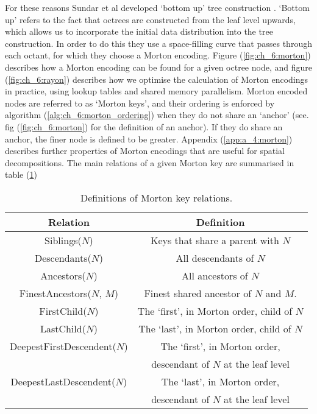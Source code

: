 For these reasons Sundar et al developed `bottom up' tree construction \cite{sundar2008bottom}. `Bottom up' refers to the fact that octrees are constructed from the leaf level upwards, which allows us to incorporate the initial data distribution into the tree construction. In order to do this they use a space-filling curve that passes through each octant, for which they choose a Morton encoding. Figure (\ref{fig:ch_6:morton}) describes how a Morton encoding can be found for a given octree node, and figure (\ref{fig:ch_6:rayon}) describes how we optimise the calculation of Morton encodings in practice, using lookup tables and shared memory parallelism. Morton encoded nodes are referred to as `Morton keys', and their ordering is enforced by algorithm (\ref{alg:ch_6:morton_ordering}) when they do not share an `anchor' (see. fig (\ref{fig:ch_6:morton}) for the definition of an anchor). If they do share an anchor, the finer node is defined to be greater. Appendix (\ref{app:a_4:morton}) describes further properties of Morton encodings that are useful for spatial decompositions. The main relations of a given Morton key are summarised in table (\ref{table:ch_6:morton})

\begin{table}[h!]
    \centering
    \begin{tabular}{||c c||} 
        \hline
        Relation & Definition \\ [0.5ex]
        \hline\hline
        Siblings($N$) & Keys that share a parent with $N$  \\
        Descendants($N$) & All descendants of $N$  \\
        Ancestors($N$) & All ancestors of $N$  \\
        FinestAncestors($N$, $M$) & Finest shared ancestor of $N$ and $M$.  \\
        FirstChild($N$) & The `first', in Morton order, child of $N$  \\
        LastChild($N$) & The `last', in Morton order, child of $N$  \\
        DeepestFirstDescendent($N$) & The `first', in Morton order,  \\ 
         &  descendant of $N$ at the leaf level \\
        DeepestLastDescendent($N$) & The `last', in Morton order, \\
         & descendant of $N$ at the leaf level \\
        
        \hline
    \end{tabular}
    \caption{Definitions of Morton key relations.}
    \label{table:ch_6:morton}
\end{table}

